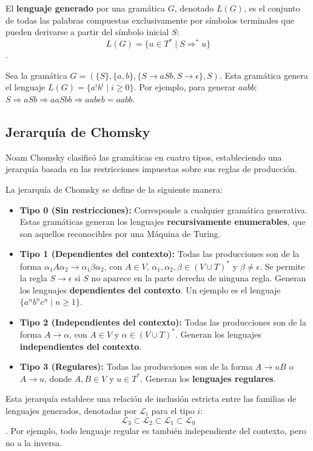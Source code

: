 \begin{definicion}
El \textbf{lenguaje generado} por una gramática $G$, denotado $L(G)$, es el conjunto de todas las palabras compuestas exclusivamente por símbolos terminales que pueden derivarse a partir del símbolo inicial $S$:
\[ L(G) = \{ u \in T^* \mid S \Rightarrow^* u \} \].
\end{definicion}

\begin{ejemplo}
Sea la gramática $G = (\{S\}, \{a, b\}, \{S \rightarrow aSb, S \rightarrow \epsilon\}, S)$.
Esta gramática genera el lenguaje $L(G) = \{a^i b^i \mid i \geq 0\}$. Por ejemplo, para generar $aabb$:
$S \Rightarrow aSb \Rightarrow aaSbb \Rightarrow aab\epsilon b = aabb$.
\end{ejemplo}

\subsection{Jerarquía de Chomsky}

Noam Chomsky clasificó las gramáticas en cuatro tipos, estableciendo una jerarquía basada en las restricciones impuestas sobre sus reglas de producción.

\begin{definicion}
La jerarquía de Chomsky se define de la siguiente manera:
\begin{itemize}
    \item \textbf{Tipo 0 (Sin restricciones):} Corresponde a cualquier gramática generativa. Estas gramáticas generan los lenguajes \textbf{recursivamente enumerables}, que son aquellos reconocibles por una Máquina de Turing.
    \item \textbf{Tipo 1 (Dependientes del contexto):} Todas las producciones son de la forma $\alpha_1 A \alpha_2 \rightarrow \alpha_1 \beta \alpha_2$, con $A \in V$, $\alpha_1, \alpha_2, \beta \in (V \cup T)^*$ y $\beta \neq \epsilon$. Se permite la regla $S \rightarrow \epsilon$ si $S$ no aparece en la parte derecha de ninguna regla. Generan los lenguajes \textbf{dependientes del contexto}. Un ejemplo es el lenguaje $\{a^n b^n c^n \mid n \geq 1\}$.
    \item \textbf{Tipo 2 (Independientes del contexto):} Todas las producciones son de la forma $A \rightarrow \alpha$, con $A \in V$ y $\alpha \in (V \cup T)^*$. Generan los lenguajes \textbf{independientes del contexto}.
    \item \textbf{Tipo 3 (Regulares):} Todas las producciones son de la forma $A \rightarrow uB$ o $A \rightarrow u$, donde $A, B \in V$ y $u \in T^*$. Generan los \textbf{lenguajes regulares}.
\end{itemize}
\end{definicion}

Esta jerarquía establece una relación de inclusión estricta entre las familias de lenguajes generados, denotadas por $\mathcal{L}_i$ para el tipo $i$:
\[ \mathcal{L}_3 \subset \mathcal{L}_2 \subset \mathcal{L}_1 \subset \mathcal{L}_0 \].
Por ejemplo, todo lenguaje regular es también independiente del contexto, pero no a la inversa.